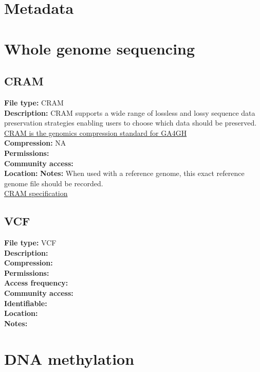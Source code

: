 \documentclass[
  11pt,
]{book}
\begin{document}
\hypertarget{metadata}{%
\chapter{Metadata}\label{metadata}}

\hypertarget{whole-genome-sequencing}{%
\chapter{Whole genome sequencing}\label{whole-genome-sequencing}}

\hypertarget{cram}{%
\section{CRAM}\label{cram}}

\textbf{File type:} CRAM\\
\textbf{Description:} CRAM supports a wide
range of lossless and lossy sequence data preservation strategies enabling users to choose which data should be preserved. \href{https://www.ga4gh.org/cram/}{CRAM is the genomics compression standard for GA4GH}\\
\textbf{Compression:} NA\\
\textbf{Permissions:}\\
\textbf{Community access:}\\
\textbf{Location:}
\textbf{Notes:} When used with a reference genome, this exact reference genome file should be recorded.\\
\href{https://samtools.github.io/hts-specs/CRAMv3.pdf}{CRAM specification}

\hypertarget{vcf}{%
\section{VCF}\label{vcf}}

\textbf{File type:} VCF\\
\textbf{Description:}\\
\textbf{Compression:}\\
\textbf{Permissions:}\\
\textbf{Access frequency:}\\
\textbf{Community access:}\\
\textbf{Identifiable:}\\
\textbf{Location:}\\
\textbf{Notes:}

\hypertarget{dna-methylation}{%
\chapter{DNA methylation}\label{dna-methylation}}
\end{document}
